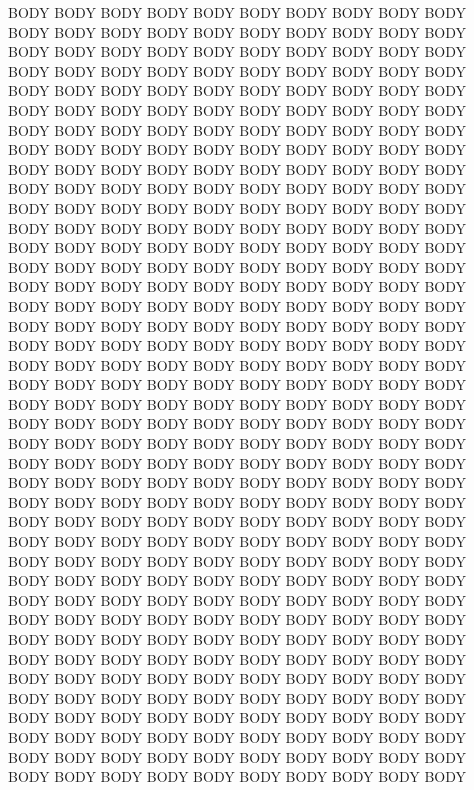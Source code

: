 BODY BODY BODY BODY BODY BODY BODY BODY BODY BODY BODY BODY BODY BODY BODY BODY BODY BODY BODY BODY BODY BODY BODY BODY BODY BODY BODY BODY BODY BODY BODY BODY BODY BODY BODY BODY BODY BODY BODY BODY BODY BODY BODY BODY BODY BODY BODY BODY BODY BODY BODY BODY BODY BODY BODY BODY BODY BODY BODY BODY BODY BODY BODY BODY BODY BODY BODY BODY BODY BODY BODY BODY BODY BODY BODY BODY BODY BODY BODY BODY BODY BODY BODY BODY BODY BODY BODY BODY BODY BODY BODY BODY BODY BODY BODY BODY BODY BODY BODY BODY BODY BODY BODY BODY BODY BODY BODY BODY BODY BODY BODY BODY BODY BODY BODY BODY BODY BODY BODY BODY BODY BODY BODY BODY BODY BODY BODY BODY BODY BODY BODY BODY BODY BODY BODY BODY BODY BODY BODY BODY BODY BODY BODY BODY BODY BODY BODY BODY BODY BODY BODY BODY BODY BODY BODY BODY BODY BODY BODY BODY BODY BODY BODY BODY BODY BODY BODY BODY BODY BODY BODY BODY BODY BODY BODY BODY BODY BODY BODY BODY BODY BODY BODY BODY BODY BODY BODY BODY BODY BODY BODY BODY BODY BODY BODY BODY BODY BODY BODY BODY BODY BODY BODY BODY BODY BODY BODY BODY BODY BODY BODY BODY BODY BODY BODY BODY BODY BODY BODY BODY BODY BODY BODY BODY BODY BODY BODY BODY BODY BODY BODY BODY BODY BODY BODY BODY BODY BODY BODY BODY BODY BODY BODY BODY BODY BODY BODY BODY BODY BODY BODY BODY BODY BODY BODY BODY BODY BODY BODY BODY BODY BODY BODY BODY BODY BODY BODY BODY BODY BODY BODY BODY BODY BODY BODY BODY BODY BODY BODY BODY BODY BODY BODY BODY BODY BODY BODY BODY BODY BODY BODY BODY BODY BODY BODY BODY BODY BODY BODY BODY BODY BODY BODY BODY BODY BODY BODY BODY BODY BODY BODY BODY BODY BODY BODY BODY BODY BODY BODY BODY BODY BODY BODY BODY BODY BODY BODY BODY BODY BODY BODY BODY BODY BODY BODY BODY BODY BODY BODY BODY BODY BODY BODY BODY BODY BODY BODY BODY BODY BODY BODY BODY BODY BODY BODY BODY BODY BODY BODY BODY BODY BODY BODY BODY BODY BODY BODY BODY BODY BODY BODY BODY BODY BODY BODY BODY BODY BODY BODY BODY BODY BODY BODY BODY BODY BODY BODY BODY BODY BODY BODY BODY BODY BODY BODY BODY BODY BODY BODY BODY 
